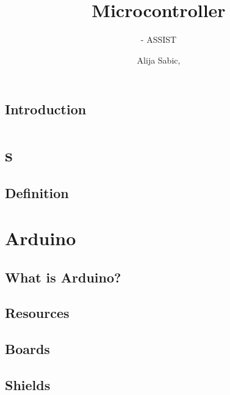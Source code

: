 \documentclass[aspectratio=169]{beamer}
\title[Microcontroller]{Microcontroller}
\subtitle{\glsentrytext{ci} - ASSIST \glsentrytext{heidi}}
\author{Alija Sabic, \glsentrytext{msc}}
\institute{Department Electronic Engineering}
\begin{document}
\begin{frame}[plain]
    \titlepage
\end{frame}

\section{}

\subsection{Introduction}

% 

\section{s}

\subsection{Definition}


\subsection{}


\section{Arduino\textregistered{}}

\subsection{What is Arduino?}

\subsection{Resources}

\subsection{Boards}

\subsection{Shields}

\end{document}
